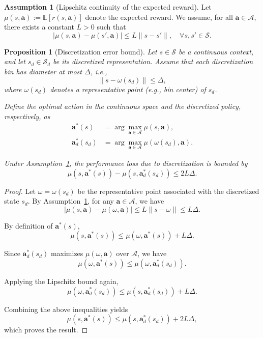 \documentclass[Afour,sageh,times]{sagej}
\newtheorem{proposition}{Proposition}
\theoremstyle{plain}
\theoremstyle{definition}
\newtheorem{assumption}{Assumption}
\begin{document}
\begin{assumption}[Lipschitz continuity of the expected reward]
\label{ass:lipschitz}
Let $\mu(s,\mathbf{a}) := \mathbb{E}[r(s,\mathbf{a})]$ denote the expected reward.
We assume, for all $\mathbf{a} \in \mathcal{A}$, there exists a constant $L > 0$ such that
\begin{equation}
\label{eq:lipschitz}
|\mu(s,\mathbf{a}) - \mu(s',\mathbf{a})| \le L \| s - s' \|, \quad \forall s, s' \in \mathcal{S}.
\end{equation}
\end{assumption}



\begin{proposition}[Discretization error bound]
\label{prop:discretization}
Let $s \in \mathcal{S}$ be a continuous context, and let $s_d \in \mathcal{S}_d$ be its discretized representation.
Assume that each discretization bin has diameter at most $\Delta$, i.e.,
\[
\| s - \omega(s_d) \| \le \Delta,
\]
where $\omega(s_d)$ denotes a representative point (e.g., bin center) of $s_d$.

Define the optimal action in the continuous space and the discretized policy, respectively, as
\begin{equation*}
\begin{aligned}
\mathbf{a}^*(s) &= \arg\max_{\mathbf{a} \in \mathcal{A}} \mu(s,\mathbf{a}), \\ \mathbf{a}_d^*(s_d) &= \arg\max_{\mathbf{a} \in \mathcal{A}} \mu(\omega(s_d), \mathbf{a}).
\end{aligned}
\end{equation*}


Under Assumption~\ref{ass:lipschitz}, the performance loss due to discretization is bounded by
\begin{equation}
\label{eq:discretization_bound}
\mu(s, \mathbf{a}^*(s)) - \mu(s, \mathbf{a}_d^*(s_d)) \le 2 L \Delta.
\end{equation}
\end{proposition}

\begin{proof}
Let $\omega = \omega(s_d)$ be the representative point associated with the discretized state $s_d$.
By Assumption~\ref{ass:lipschitz}, for any $\mathbf{a} \in \mathcal{A}$, we have
\begin{equation}
\label{eq:lipschitz_step}
|\mu(s,\mathbf{a}) - \mu(\omega,\mathbf{a})| \le L \| s - \omega \| \le L \Delta.
\end{equation}

By definition of $\mathbf{a}^*(s)$,
\[
\mu(s,\mathbf{a}^*(s)) \le \mu(\omega,\mathbf{a}^*(s)) + L\Delta.
\]

Since $\mathbf{a}_d^*(s_d)$ maximizes $\mu(\omega,\mathbf{a})$ over $\mathcal{A}$, we have
\[
\mu(\omega,\mathbf{a}^*(s)) \le \mu(\omega,\mathbf{a}_d^*(s_d)).
\]

Applying the Lipschitz bound again,
\[
\mu(\omega,\mathbf{a}_d^*(s_d)) \le \mu(s,\mathbf{a}_d^*(s_d)) + L\Delta.
\]

Combining the above inequalities yields
\[
\mu(s,\mathbf{a}^*(s)) \le \mu(s,\mathbf{a}_d^*(s_d)) + 2L\Delta,
\]
which proves the result.
\end{proof}
\end{document}
